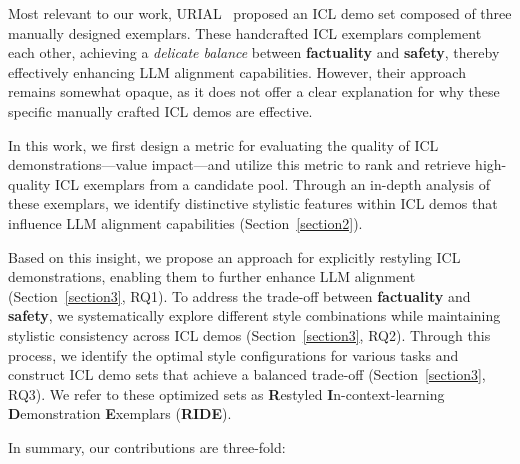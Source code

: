 
Most relevant to our work, URIAL~\citep{DBLP:conf/iclr/LinRLDSCB024} proposed an ICL demo set composed of three manually designed exemplars. These handcrafted ICL exemplars complement each other, achieving a \textit{delicate balance} between \textbf{\color{myblue} factuality} and \textbf{\color{myred} safety}, thereby effectively enhancing LLM alignment capabilities. However, their approach remains somewhat opaque, as it does not offer a clear explanation for why these specific manually crafted ICL demos are effective.

In this work, we first design a metric for evaluating the quality of ICL demonstrations—value impact—and utilize this metric to rank and retrieve high-quality ICL exemplars from a candidate pool. Through an in-depth analysis of these exemplars, we identify distinctive stylistic features within ICL demos that influence LLM alignment capabilities (Section~\ref{section2}). 

Based on this insight, we propose an approach for explicitly restyling ICL demonstrations, enabling them to further enhance LLM alignment (Section~\ref{section3}, RQ1).
To address the trade-off between \textbf{\color{myblue} factuality} and \textbf{\color{myred} safety}, we systematically explore different style combinations while maintaining stylistic consistency across ICL demos (Section~\ref{section3}, RQ2). Through this process, we identify the optimal style configurations for various tasks and construct ICL demo sets that achieve a balanced trade-off (Section~\ref{section3}, RQ3). We refer to these optimized sets as \textbf{R}estyled \textbf{I}n-context-learning \textbf{D}emonstration \textbf{E}xemplars (\textbf{RIDE}).


In summary, our contributions are three-fold:

